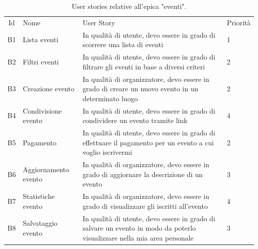 \documentclass[9pt]{extarticle}
\begin{document}
\begin{table}[!htb]
	\centering
	\renewcommand{\arraystretch}{1.7}
	\begin{tabular}{clp{7cm}l} %
		\toprule
		\rowcolor{gray!20}
		\multicolumn{4}{c}{\textbf{Eventi}}\\ \midrule
		\rowcolor{gray!20}
		Id & Nome & User Story & Priorità \\ \midrule
		B1  & Lista eventi            & In qualità di utente, devo essere in grado di scorrere una lista di eventi                                               &  1\\
		B2  & Filtri eventi           & In qualità di utente, devo essere in grado di filtrare gli eventi in base a diversi criteri                                      &  2 \\
		B3  & Creazione evento        & In qualità di organizzatore, devo essere in grado di creare un nuovo evento in un determinato luogo                      &  2 \\
		B4  & Condivisione evento     & In qualità di utente, devo essere in grado di condividere un evento tramite link                                         &  4\\
		B5  & Pagamento               & In qualità di utente, devo essere in grado di effettuare il pagamento per un evento a cui voglio iscrivermi              & 2\\
		B6  & Aggiornamento evento    & In qualità di organizzatore, devo essere in grado di aggiornare la descrizione di un evento                              & 3\\
		B7  & Statistiche evento      & In qualità di organizzatore, devo essere in grado di visualizzare gli iscritti all'evento                                & 4\\
		B8  & Salvataggio evento      & In qualità di utente, devo essere in grado di salvare un evento in modo da poterlo visualizzare nella mia area personale & 3\\
		\bottomrule
	\end{tabular}
	\caption{User stories relative all'epica "eventi".}
	\label{tab:eventi}
\end{table}

\newpage
\end{document}
